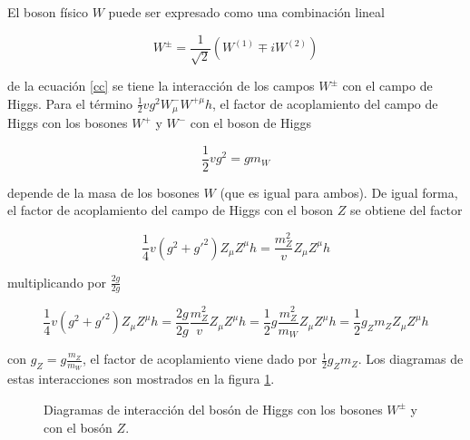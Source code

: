 El boson físico $W$ puede ser expresado como una combinación lineal

$$ W^{\pm} = \frac{1}{\sqrt{2}} (W^{(1)} \mp iW^{(2)}) $$

de la ecuación \ref{cc} se tiene la interacción de los campos $W^{\pm}$ con el campo de Higgs. Para el término $\frac{1}{2}vg^2W_{\mu}^-W^{+\mu}h$, el factor de acoplamiento del campo de Higgs con los bosones $W^+$ y $W^-$ con el boson de Higgs 

$$ \frac{1}{2}vg^2 = gm_W $$

depende de la masa de los bosones $W$ (que es igual para ambos). De igual forma, el factor de acoplamiento del campo de Higgs con el boson $Z$ se obtiene del factor

$$ \frac{1}{4}v(g^2+g'^2)Z_{\mu}Z^{\mu}h=\frac{m_Z^2}{v} Z_{\mu}Z^{\mu}h $$

multiplicando por $\frac{2g}{2g}$

$$ \frac{1}{4}v(g^2+g'^2)Z_{\mu}Z^{\mu}h=\frac{2g}{2g} \frac{m_Z^2}{v} Z_{\mu}Z^{\mu}h = \frac{1}{2}g\frac{m_Z^2}{m_W} Z_{\mu}Z^{\mu}h 
 = \frac{1}{2} g_Zm_Z Z_{\mu}Z^{\mu}h $$

con $g_Z = g\frac{m_Z}{m_W}$, el factor de acoplamiento viene dado por $\frac{1}{2}g_Zm_Z$. Los diagramas de estas interacciones son mostrados en la figura \ref{hwwz}.

\begin{figure}[!h]
    \centering
    \begin{subfigure}[b]{0.3\linewidth}
    \end{subfigure}
    \begin{subfigure}[b]{0.3\linewidth}
    \end{subfigure}
    \caption{Diagramas de interacción del bosón de Higgs con los bosones $W^{\pm}$ y con el bosón $Z$.}
    \label{hwwz}
\end{figure}

